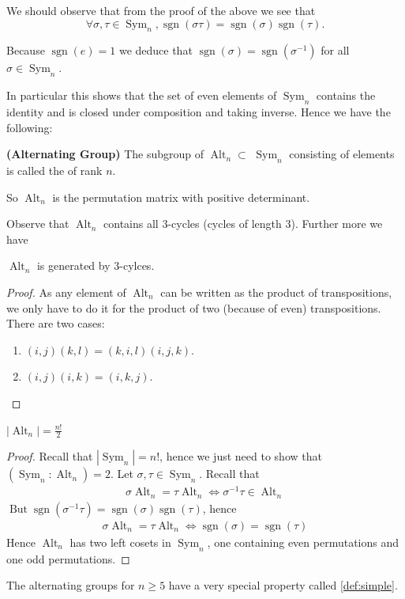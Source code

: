 \documentclass{article}
\newcommand{\bfs}[1]{\textbf{({#1}) }}
\newcommand{\Sym}{\operatorname{Sym}}
\newcommand{\Alt}{\operatorname{Alt}}
\begin{document}
\begin{rema}
We should observe that from the proof of the above we see that $$\forall \sigma, \tau \in \operatorname{Sym}_{n}, \operatorname{sgn}(\sigma \tau)=\operatorname{sgn}(\sigma) \operatorname{sgn}(\tau) .$$

Because $\operatorname{sgn}(e)=1$ we deduce that $\operatorname{sgn}(\sigma)=\operatorname{sgn}\left(\sigma^{-1}\right)$ for all $\sigma \in \Sym_{n} .$
\end{rema}

In particular this shows that the set of even elements of $\Sym_{n}$ contains the identity and is closed under composition and taking inverse. Hence we have the following:

\begin{defa}{\bfs{Alternating Group}}
The subgroup of $\Alt_{n} \subset$  $\Sym_{n}$ consisting of  elements is called the  of rank $n$.
\end{defa}
\begin{rema}
So $\Alt_{n}$ is the permutation matrix with positive determinant.
\end{rema}
Observe that $\Alt_{n}$ contains all $3$-cycles (cycles of length $3$). Further more we have
\begin{lema}
$\Alt_{n}$ is generated by $3$-cylces.
\end{lema}
\begin{proof}
As any element of $\Alt_{n}$ can be written as the product of transpositions, we only have to do it for the product of two (because of even) transpositions. There are two cases:
\begin{enumerate}
    \item $(i,j)(k,l)=(k,i,l)(i,j,k) .$
    \item $(i,j)(i,k)=(i,k,j)$.
\end{enumerate} 
\end{proof}
\begin{lema}
$\left|\Alt_{n}\right|=\frac{n !}{2}$
\end{lema}
\begin{proof}
Recall that $\left|\Sym_{n}\right|=n !$, hence we just need to show that $\left(\operatorname{Sym}_{n}: \Alt_{n}\right)=2$. Let $\sigma, \tau \in \Sym_{n}$. Recall that
\begin{align*}
\sigma \Alt_{n}=\tau \Alt_{n} \Longleftrightarrow \sigma^{-1} \tau \in \Alt_{n}
\end{align*}
$\operatorname{But} \operatorname{sgn}\left(\sigma^{-1} \tau\right)=\operatorname{sgn}(\sigma) \operatorname{sgn}(\tau)$, hence
\begin{align*}
\sigma \Alt_{n}=\tau \Alt_{n} \Longleftrightarrow \operatorname{sgn}(\sigma)=\operatorname{sgn}(\tau)
\end{align*}
Hence $\Alt_{n}$ has two left cosets in $\Sym_{n}$, one containing even permutations and one odd permutations.
\end{proof} 
\begin{rema}
The alternating groups for $n \geq 5$ have a very special property called  \cref{def:simple}.
\end{rema}
\end{document}
